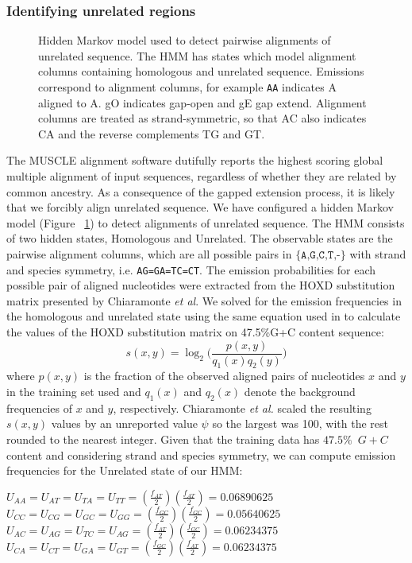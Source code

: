 \documentclass{ws-procs975x65}
\begin{document}
\subsubsection{Identifying unrelated regions}
\begin{figure}[t]
\centering {}
\caption{Hidden Markov model used to detect pairwise alignments of unrelated
sequence. The HMM has states which model alignment columns containing
homologous and unrelated sequence.  Emissions correspond to alignment
columns, for example \texttt{AA} indicates A aligned to A.  gO
indicates gap-open and gE gap extend. Alignment columns are treated as
strand-symmetric, so that AC also indicates CA and the reverse
complements TG and GT.}
\label{fig-hmm}\vspace{-0.2cm}
\end{figure}
The MUSCLE alignment software dutifully reports the highest scoring
global multiple alignment of input sequences, regardless of whether
they are related by common ancestry. As a consequence of the gapped
extension process, it is likely that we forcibly align unrelated
sequence. We have configured a hidden Markov model (Figure
~\ref{fig-hmm}) to detect alignments of unrelated sequence. The HMM
consists of two hidden states, Homologous and Unrelated. The
observable states are the pairwise alignment columns, which are all
possible pairs in $\texttt{{\{A,G,C,T,-\}}}$ with strand and species
symmetry, i.e. \texttt{AG=GA=TC=CT}.  The emission probabilities for
each possible pair of aligned nucleotides were extracted from the HOXD
substitution matrix presented by Chiaramonte \textit{et al}\cite{hoxd}.
We solved for the emission frequencies in the
homologous and unrelated state using the same equation used in to
calculate the values of the HOXD substitution matrix on 47.5\%G+C
content sequence\cite{hoxd}:
\begin{equation}
s(x,y)= \log_{2}{\Bigg(\frac{p(x,y)}{q_{1}(x)q_{2}(y)}\Bigg)}
\end{equation}
{w}here $p(x,y)$ is the fraction of the observed aligned pairs of
nucleotides $x$ and $y$ in the training set used and $q_{1}(x)$ and
$q_{2}(x)$ denote the background frequencies of $x$ and $y$,
respectively. Chiaramonte \textit{et al.} scaled the resulting
$s(x,y)$ values by an unreported value $\psi$ so the largest was 100,
with the rest rounded to the nearest integer.  Given that the training
data has $47.5\%$~$G+C$ content and considering strand and species
symmetry, we can compute emission frequencies for the Unrelated state
of our HMM:
\begin{center}$U_{AA}=U_{AT}=U_{TA}=U_{TT}=(\frac{f_{AT}}{2})(\frac{f_{AT}}{2})
= 0.06890625$ \\
$U_{CC}=U_{CG}=U_{GC}=U_{GG}=(\frac{f_{GC}}{2})(\frac{f_{GC}}{2}) =
0.05640625$ \\
$U_{AC}=U_{AG}=U_{TC}=U_{AG}=(\frac{f_{AT}}{2})(\frac{f_{GC}}{2}) =
0.06234375$ \\
$U_{CA}=U_{CT}=U_{GA}=U_{GT}=(\frac{f_{GC}}{2})(\frac{f_{AT}}{2}) =
0.06234375$ \\
\end{center}
\end{document}
